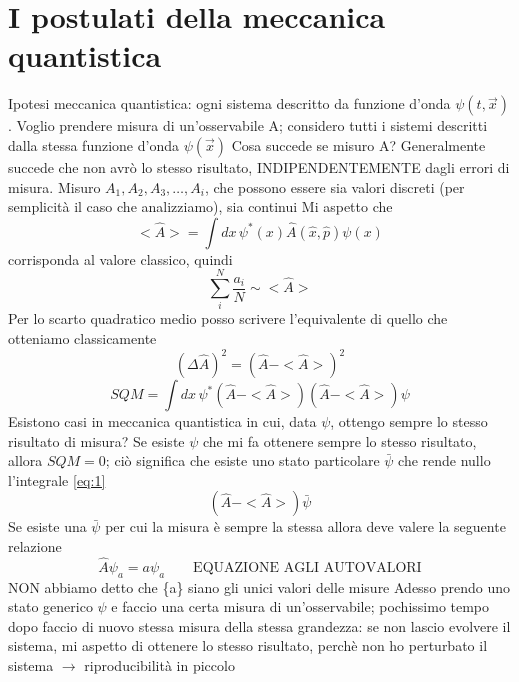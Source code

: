 \chapter{I postulati della meccanica quantistica}
Ipotesi meccanica quantistica: ogni sistema descritto da funzione d'onda $\psi(t,\vec{x})$. \newline
Voglio prendere misura di un'osservabile A; considero tutti i sistemi descritti dalla stessa funzione d'onda $\psi(\vec{x})$ \newline
Cosa succede se misuro A? Generalmente succede che non avrò lo stesso risultato, INDIPENDENTEMENTE dagli errori di misura. Misuro $A_1,A_2,A_3,\dots,A_i$, che possono essere sia valori discreti (per semplicità il caso che analizziamo), sia continui \newline
Mi aspetto che 
\begin{equation*}
    <\hat{A}> = \int dx \, \psi^*(x)\hat{A}(\hat{x},\hat{p})\psi(x)
\end{equation*}
corrisponda al valore classico, quindi
\begin{equation*}
    \sum_i^N \frac{a_i}{N} \sim <\hat{A}>
\end{equation*}
Per lo scarto quadratico medio posso scrivere l'equivalente di quello che otteniamo classicamente
\begin{equation*}
    {(\Delta \hat{A})}^2 = {(\hat{A}-<\hat{A}>)}^2  
\end{equation*}
\begin{equation}
    \label{eq:1}
    SQM = \int dx \, \psi^* (\hat{A}-<\hat{A}>)(\hat{A}-<\hat{A}>)\psi
\end{equation}
Esistono casi in meccanica quantistica in cui, data $\psi$, ottengo sempre lo stesso risultato di misura? \newline
Se esiste $\psi$ che mi fa ottenere sempre lo stesso risultato, allora $SQM = 0$; ciò significa che esiste uno stato particolare $\bar{\psi}$ che rende nullo l'integrale \ref{eq:1}
\begin{equation*}
    (\hat{A}-<\hat{A}>)\bar{\psi}
\end{equation*}
Se esiste una $\bar{\psi}$ per cui la misura è sempre la stessa allora deve valere la seguente relazione
\begin{equation*}
    \label{eq:autovalori}
    \hat{A}\psi_a = a\psi_a \qquad \text{EQUAZIONE AGLI AUTOVALORI}
\end{equation*}
NON abbiamo detto che \{a\} siano gli unici valori delle misure \newline
Adesso prendo uno stato generico $\psi$ e faccio una certa misura di un'osservabile; pochissimo tempo dopo faccio di nuovo stessa misura della stessa grandezza: se non lascio evolvere il sistema, mi aspetto di ottenere lo stesso risultato, perchè non ho perturbato il sistema $\rightarrow$ riproducibilità in piccolo \newline

